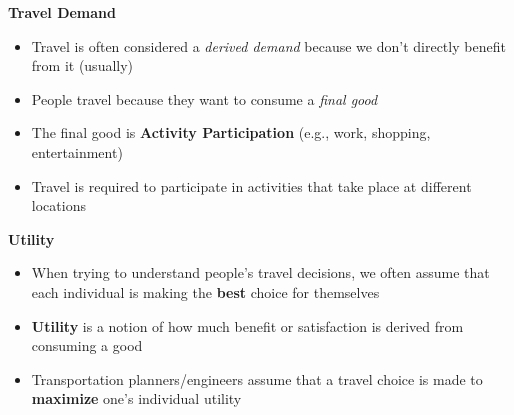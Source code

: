 \documentclass[aspectratio=169]{beamer}
\begin{document}
\begin{frame}
	
	\textbf{Travel Demand}
	\vspace{4mm}
	
	\begin{itemize}
		\item Travel is often considered a \textit{derived demand} because we don’t directly benefit from it (usually)
		
		\item People travel because they want to consume a \textit{final good}
		
		\item The final good is \textbf{Activity Participation} (e.g., work, shopping, entertainment)
		 
		\item Travel is required to participate in activities that take place at different locations
	\end{itemize}
	
\end{frame}





\begin{frame}
	
	\textbf{Utility}
	\vspace{4mm}
	
	\begin{itemize}
		\item When trying to understand people’s travel decisions, we often assume that each individual is making the \textbf{best} choice for themselves
		
		\item \textbf{Utility} is a notion of how much benefit or satisfaction is derived from consuming a good
		
		\item Transportation planners/engineers assume that a travel choice is made to \textbf{maximize} one’s individual utility
	\end{itemize}
	
	
\end{frame}
\end{document}
